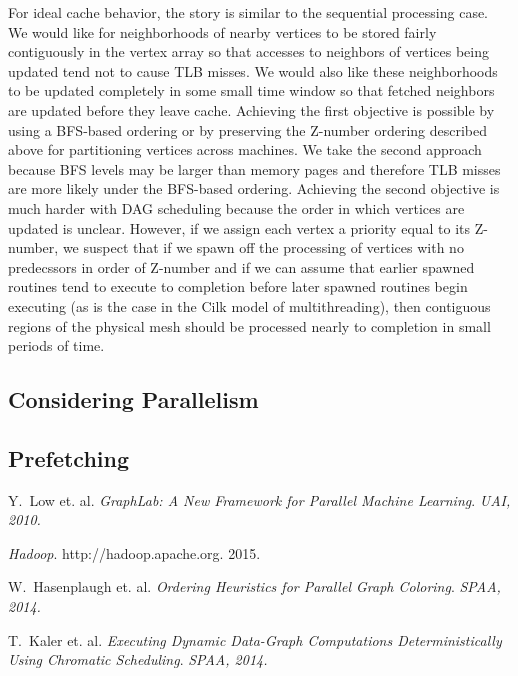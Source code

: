 \documentclass[journal]{IEEEtran}
\begin{document}
For ideal cache behavior, the story is similar to the sequential processing case. We would like for neighborhoods of nearby vertices to be stored fairly contiguously in the vertex array so that accesses to neighbors of vertices being updated tend not to cause TLB misses. We would also like these neighborhoods to be updated completely in some small time window so that fetched neighbors are updated before they leave cache. Achieving the first objective is possible by using a BFS-based ordering or by preserving the Z-number ordering described above for partitioning vertices across machines. We take the second approach because BFS levels may be larger than memory pages and therefore TLB misses are more likely under the BFS-based ordering. Achieving the second objective is much harder with DAG scheduling because the order in which vertices are updated is unclear. However, if we assign each vertex a priority equal to its Z-number, we suspect that if we spawn off the processing of vertices with no predecssors in order of Z-number and if we can assume that earlier spawned routines tend to execute to completion before later spawned routines begin executing (as is the case in the Cilk model of multithreading), then contiguous regions of the physical mesh should be processed nearly to completion in small periods of time. 



\subsection{Considering Parallelism}

\subsection{Prefetching}


\ifCLASSOPTIONcaptionsoff
  \newpage
\fi

\begin{thebibliography}{1}

Y.~Low et. al. \emph{GraphLab: A New Framework for Parallel Machine Learning}. \it{UAI}, 2010.

\emph{Hadoop}. http://hadoop.apache.org. 2015.

W.~Hasenplaugh et. al. \emph{Ordering Heuristics for Parallel Graph Coloring}. \it{SPAA}, 2014.

T.~Kaler et. al. \emph{Executing Dynamic Data-Graph Computations Deterministically Using Chromatic Scheduling}. \it{SPAA}, 2014.

\end{thebibliography}
\end{document}
